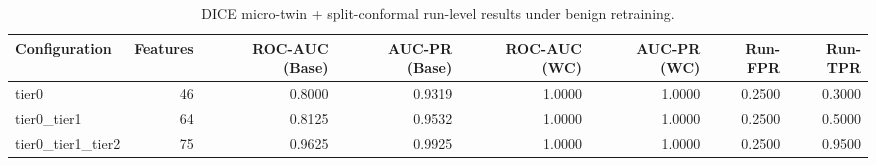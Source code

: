 \begin{table}[t]
\centering
\caption{DICE micro-twin + split-conformal run-level results under benign retraining.}
\label{tab:dice_full_overall}
\footnotesize
\begin{tabular}{lrrrrrrr}
\toprule
Configuration & Features & ROC-AUC (Base) & AUC-PR (Base) & ROC-AUC (WC) & AUC-PR (WC) & Run-FPR & Run-TPR \\
\midrule
tier0 & 46 & 0.8000 & 0.9319 & 1.0000 & 1.0000 & 0.2500 & 0.3000 \\
tier0_tier1 & 64 & 0.8125 & 0.9532 & 1.0000 & 1.0000 & 0.2500 & 0.5000 \\
tier0_tier1_tier2 & 75 & 0.9625 & 0.9925 & 1.0000 & 1.0000 & 0.2500 & 0.9500 \\
\bottomrule
\end{tabular}

\end{table}
